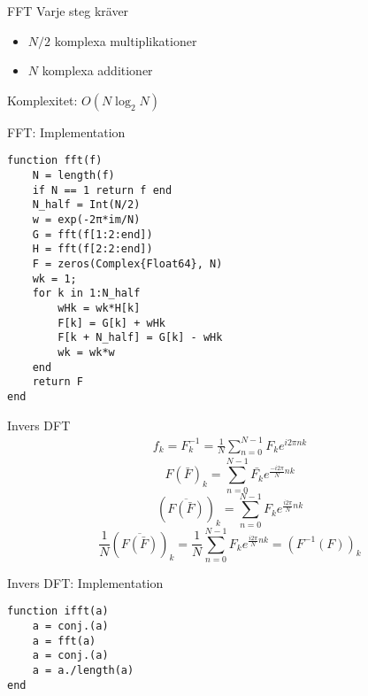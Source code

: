 \documentclass[presentation]{beamer}
\begin{document}
\begin{frame}[label={sec:orge9f65b9}]{FFT}
Varje steg kräver
\begin{itemize}
\item \(N/2\) komplexa multiplikationer
\item \(N\) komplexa additioner
\end{itemize}

Komplexitet: \(O(N \log_2{N})\)
\end{frame}

\begin{frame}[label={sec:org958a1fd},fragile]{FFT: Implementation}
 \begin{verbatim}
function fft(f)
    N = length(f)
    if N == 1 return f end
    N_half = Int(N/2)
    w = exp(-2π*im/N)
    G = fft(f[1:2:end])
    H = fft(f[2:2:end])
    F = zeros(Complex{Float64}, N)
    wk = 1;
    for k in 1:N_half
        wHk = wk*H[k]
        F[k] = G[k] + wHk
        F[k + N_half] = G[k] - wHk
        wk = wk*w
    end
    return F
end
\end{verbatim}
\end{frame}

\begin{frame}[label={sec:orgbc9c693}]{Invers DFT}
\begin{align*}
f_{k} = F_{k}^{-1} = \frac{1}{N}\sum_{n=0}^{N-1}F_{k}e^{i2 \pi nk}
\end{align*}
\pause
\begin{equation*}
  F(\bar{F})_{k} = \sum_{n=0}^{N-1}\bar{F_{k}}e^{\frac{-i2 \pi}{N}nk}
\end{equation*}
\pause
\begin{equation*}
  (\overline{F(\bar{F})})_{k} = \sum_{n=0}^{N-1}F_{k}e^{\frac{i2 \pi}{N}nk}
\end{equation*}
\pause
\begin{equation*}
    \frac{1}{N}(\overline{F(\bar{F})})_{k} =
  \frac{1}{N}\sum_{n=0}^{N-1}F_{k}e^{\frac{i2 \pi}{N}nk} = (F^{-1}(F))_{k}
\end{equation*}

\newpage
\end{frame}

\begin{frame}[label={sec:org6f303dd},fragile]{Invers DFT: Implementation}
 \begin{verbatim}
function ifft(a)
    a = conj.(a)
    a = fft(a)
    a = conj.(a)
    a = a./length(a)
end
\end{verbatim}
\end{frame}
\end{document}
